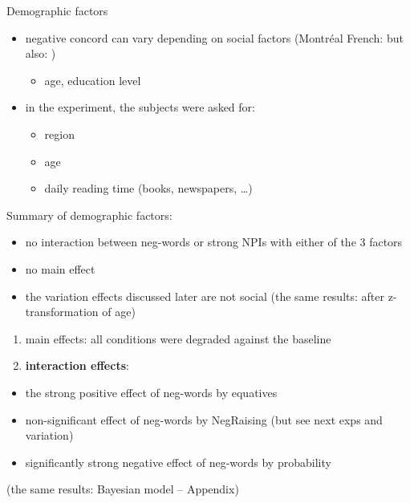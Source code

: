 \documentclass[
  ignorenonframetext,
]{beamer}
\providecommand{\tightlist}{%
  \setlength{\itemsep}{0pt}\setlength{\parskip}{0pt}}
\begin{document}
\begin{frame}
\begin{block}{Demographic factors}
\protect\hypertarget{demographic-factors}{}
\begin{itemize}
\tightlist
\item
  negative concord can vary depending on social factors (Montréal
  French: \citet{burnett2015variable} but also:
  \citet{burnett2018structural})

  \begin{itemize}
  \tightlist
  \item
    age, education level
  \end{itemize}
\item
  in the experiment, the subjects were asked for:

  \begin{itemize}
  \tightlist
  \item
    region
  \item
    age
  \item
    daily reading time (books, newspapers, \ldots)
  \end{itemize}
\end{itemize}

Summary of demographic factors:

\begin{itemize}
\tightlist
\item
  no interaction between neg-words or strong NPIs with either of the 3
  factors
\item
  no main effect
\item
  the variation effects discussed later are not social (the same
  results: after z-transformation of age)
\end{itemize}
\end{block}
\end{frame}

\begin{frame}
\begin{enumerate}
\item
  main effects: all conditions were degraded against the baseline
\item
  \textbf{interaction effects}:
\end{enumerate}

\begin{itemize}
\tightlist
\item
  the strong positive effect of neg-words by equatives
\item
  non-significant effect of neg-words by NegRaising (but see next exps
  and variation)
\item
  significantly strong negative effect of neg-words by probability
\end{itemize}

(the same results: Bayesian model -- Appendix)
\end{frame}
\end{document}
